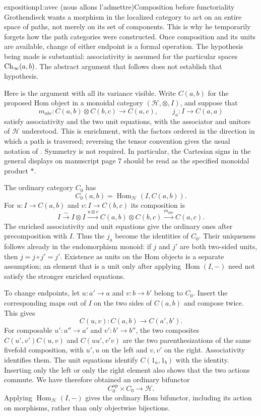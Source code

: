 \begin{dcomment}{exposition}{p1:avec (nous allons l'admettre)}{Composition before functoriality}
Grothendieck wants a morphism in the localized category to act on an entire space of paths, not merely on its set of components. This is why he temporarily forgets how the path categories were constructed. Once composition and its units are available, change of either endpoint is a formal operation. The hypothesis being made is substantial: associativity is assumed for the particular spaces $\mathrm{Ch}_\infty(a,b)$. The abstract argument that follows does not establish that hypothesis.

Here is the argument with all its variance visible. Write $C(a,b)$ for the proposed Hom object in a monoidal category $(\mathcal H,\otimes,I)$, and suppose that
\[
 m_{abc}:C(a,b)\otimes C(b,c)\longrightarrow C(a,c),
 \qquad j_a:I\longrightarrow C(a,a)
\]
satisfy associativity and the two unit equations, with the associator and unitors of $\mathcal H$ understood. This is enrichment, with the factors ordered in the direction in which a path is traversed; reversing the tensor convention gives the usual notation of \citet[\S\S1.1--1.3]{Kelly1982}. Symmetry is not required. In particular, the Cartesian signs in the general displays on manuscript page 7 should be read as the specified monoidal product $*$.

The ordinary category $C_0$ has
\[
 C_0(a,b)=\operatorname{Hom}_{\mathcal H}(I,C(a,b)).
\]
For $u:I\to C(a,b)$ and $v:I\to C(b,c)$ its composition is
\[
 I\xrightarrow{\sim}I\otimes I
   \xrightarrow{u\otimes v}C(a,b)\otimes C(b,c)
   \xrightarrow{m_{abc}}C(a,c).
\]
The enriched associativity and unit equations give the ordinary ones after precomposition with $I$. Thus the $j_a$ become the identities of $C_0$. Their uniqueness follows already in the endomorphism monoid: if $j$ and $j'$ are both two-sided units, then $j=j\circ j'=j'$. Existence as units on the Hom objects is a separate assumption; an element that is a unit only after applying $\operatorname{Hom}(I,-)$ need not satisfy the stronger enriched equations.

To change endpoints, let $u:a'\to a$ and $v:b\to b'$ belong to $C_0$. Insert the corresponding maps out of $I$ on the two sides of $C(a,b)$ and compose twice. This gives
\[
 C(u,v):C(a,b)\longrightarrow C(a',b').
\]
For composable $u':a''\to a'$ and $v':b'\to b''$, the two composites $C(u',v')C(u,v)$ and $C(uu',v'v)$ are the two parenthesizations of the same fivefold composition, with $u',u$ on the left and $v,v'$ on the right. Associativity identifies them. The unit equations identify $C(1_a,1_b)$ with the identity. Inserting only the left or only the right element also shows that the two actions commute. We have therefore obtained an ordinary bifunctor
\[
 C_0^{\mathrm{op}}\times C_0\longrightarrow\mathcal H.
\]
Applying $\operatorname{Hom}_{\mathcal H}(I,-)$ gives the ordinary Hom bifunctor, including its action on morphisms, rather than only objectwise bijections.


\end{dcomment}
